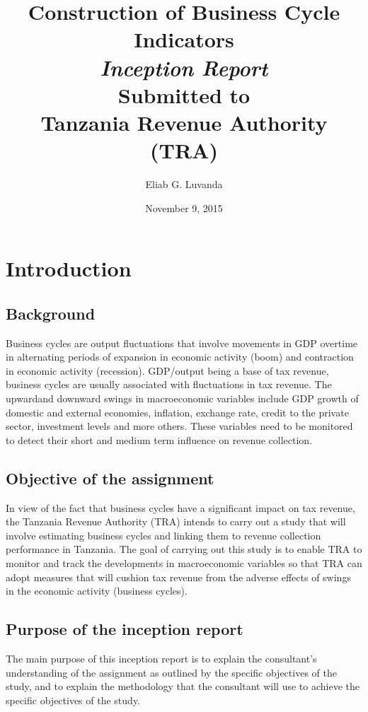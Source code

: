\documentclass[12pt,a4paper,final]{article}
\author{Eliab G. Luvanda}
\title{Construction of Business Cycle Indicators \\
\textit{Inception Report} \\
Submitted to \\
\textbf{Tanzania Revenue Authority (TRA)}}
\date{November 9, 2015}
\begin{document}
\maketitle

\newpage
\tableofcontents

\newpage
\section{Introduction}

\subsection{Background}
Business cycles are output fluctuations that involve movements in GDP overtime in alternating periods of expansion in economic activity (boom) and contraction in economic activity (recession). GDP/output being a base of tax revenue, business cycles are usually associated with fluctuations in tax revenue.  The upwardand downward swings in macroeconomic variables include GDP growth of domestic  and external economies, inflation, exchange rate, credit to the private sector, investment levels and more others.  These variables need to be monitored to detect their short and medium term influence on revenue collection.

\subsection{Objective of the assignment}
In view of the fact that business cycles have a significant impact on tax revenue, the Tanzania Revenue Authority (TRA) intends to carry out a study that will involve estimating business cycles and linking them to revenue collection performance in Tanzania.  The goal of carrying out this study is to enable TRA to monitor and track the developments in macroeconomic variables so that TRA can adopt measures that will cushion tax revenue from the adverse effects of swings in the economic activity (business cycles).

\subsection{Purpose of the inception report}
The main purpose of this inception report is to explain the consultant's understanding of the assignment as outlined by the specific objectives of the study, and to explain the methodology that the consultant will use to achieve the specific objectives of the study.
\end{document}
